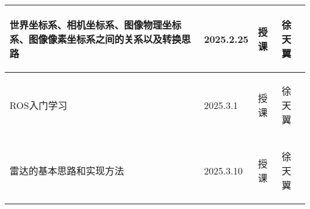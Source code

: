 \begin{longtable}{ p{6cm} | p{3cm} | p{1.5cm} | p{4.3cm} |}
    \hline

        \begin{center}
            世界坐标系、相机坐标系、图像物理坐标系、图像像素坐标系之间的关系以及转换思路
        \end{center}&
        \begin{center}
            2025.2.25
        \end{center}&
        \begin{center}
            授课
        \end{center}&
        \begin{center}
            徐天翼
        \end{center}\\

    \hline

        \begin{center}
            ROS入门学习
        \end{center}&
        \begin{center}
            2025.3.1
        \end{center}&
        \begin{center}
            授课
        \end{center}&
        \begin{center}
            徐天翼
        \end{center}\\

    \hline

        \begin{center}
            雷达的基本思路和实现方法
        \end{center}&
        \begin{center}
            2025.3.10
        \end{center}&
        \begin{center}
            授课
        \end{center}&
        \begin{center}
            徐天翼
        \end{center}\\

    \hline
    
\end{longtable}
